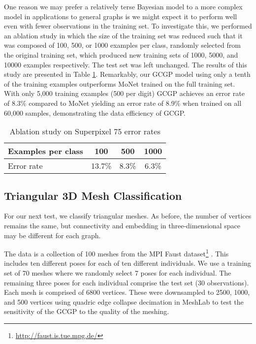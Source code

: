 \documentclass{article}
\begin{document}
One reason we may prefer a relatively terse Bayesian model to a more complex model in applications to general graphs is we might expect it to perform well even with fewer observations in the training set. To investigate this, we performed an ablation study in which the size of the training set was reduced such that it was composed of 100, 500, or 1000 examples per class, randomly selected from the original training set, which produced new training sets of 1000, 5000, and 10000 examples respectively. The test set was left unchanged.  
The results of this study are presented in Table \ref{tab:ablation}. Remarkably, our GCGP model using only a tenth of the training examples outperforms MoNet trained on the full training set. With only 5,000 training examples (500 per digit) GCGP achieves an error rate of 8.3\% compared to MoNet yielding an error rate of 8.9\% when trained on all 60,000 samples, demonstrating the data efficiency of GCGP. 
\begin{table}[tb]
	\centering
	\caption{Ablation study on Superpixel 75 error rates}
	\label{tab:ablation}
	\begin{tabular}{lccc}
		\toprule
		Examples per class & 100 &  500 & 1000\\
		\midrule
		Error rate & 13.7\% & 8.3\% & 6.3\% \\ 
	\end{tabular}
	\vspace{-.6cm}
\end{table}

\subsection{Triangular 3D Mesh Classification}\label{sec:meshes}



For our next test, we classify triangular meshes. As before, the number of vertices remains the same, but connectivity and embedding in three-dimensional space may be different for each graph.


The data is a collection of 100 meshes from the MPI Faust dataset\footnote{\url{http://faust.is.tue.mpg.de/}} \cite{faust}. This includes ten different poses for each of ten different individuals. We use a training set of 70 meshes where we randomly select 7 poses for each individual. The remaining three poses for each individual comprise the test set (30 observations). Each mesh is comprised of 6800 vertices. These were downsampled to 2500, 1000, and 500 vertices using quadric edge collapse decimation in MeshLab \citep{meshlab} to test the sensitivity of the GCGP to the quality of the meshing.
\end{document}
